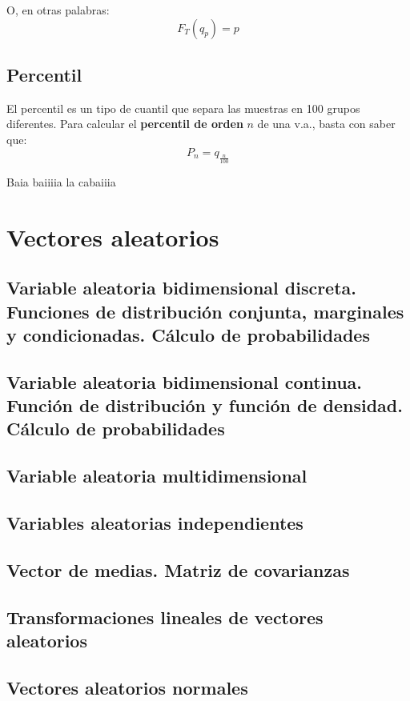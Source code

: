 \documentclass[a4paper]{book}
\numberwithin{figure}{section}
\numberwithin{equation}{subsection}
\numberwithin{figure}{chapter}
\theoremstyle{definition}
\begin{document}
O, en otras palabras: \[\boxed{F_T(q_p)=p}\]


\section{Percentil}
El percentil es un tipo de cuantil que separa las muestras en 100 grupos diferentes. Para calcular el \textbf{percentil de orden} $n$ de una v.a., basta con saber que: \[P_n = q_{\frac{n}{100}}\]

Baia baiiiia la cabaiiia

\chapter{Vectores aleatorios}


\section{Variable aleatoria bidimensional discreta. Funciones de distribución conjunta, marginales y condicionadas. Cálculo de probabilidades}

\section{Variable aleatoria bidimensional continua. Función de distribución y función de densidad. Cálculo de probabilidades}

\section{Variable aleatoria multidimensional}

\section{Variables aleatorias independientes}

\section{Vector de medias. Matriz de covarianzas}

\section{Transformaciones lineales de vectores aleatorios}

\section{Vectores aleatorios normales}
\end{document}
